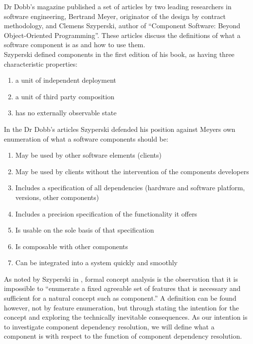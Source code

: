 Dr Dobb's magazine published a set of articles by two leading researchers in software engineering, Bertrand Meyer, originator of the design by contract methodology, 
and Clemens Szyperski, author of ``Component Software: Beyond Object-Oriented Programming''. 
These articles \cite{szyperski_components_2000, szyperski_point_2000, meyer_what_2000,meyer_significance_1999} discuss the
definitions of what a software component is as and how to use them.\\ 
Szyperski defined components in the first edition of his book, \cite{szyperski_component_2002} as having three characteristic properties:
\begin{enumerate}
  \item a unit of independent deployment
  \item a unit of third party composition
  \item has no externally observable state
\end{enumerate}

In the Dr Dobb's articles Szyperski defended his position against Meyers own enumeration of what a software components should be:
\begin{enumerate}
  \item May be used by other software elements (clients)
  \item May be used by clients without the intervention of the components
  developers
  \item Includes a specification of all dependencies (hardware and software
  platform, versions, other components)
  \item Includes a precision specification of the functionality it offers
  \item Is usable on the sole basis of that specification
  \item Is composable with other components
  \item Can be integrated into a system quickly and smoothly
\end{enumerate}

{}As noted by Szyperski in \cite{szyperski_component_2002}, formal concept analysis \cite{ganter_formal_1999} is the observation that it is impossible to
{}``enumerate a fixed agreeable set of features that is necessary and sufficient for a natural concept such as component.'' 
{}A definition can be found however, not by feature enumeration, but through stating the intention for the concept and exploring the 
{}technically inevitable consequences. 
{}As our intention is to investigate component dependency resolution, we will define what a component is with respect to the function of component dependency resolution.

